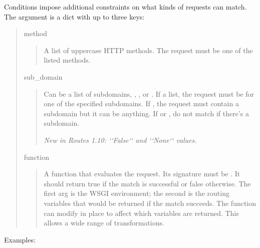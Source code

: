 \documentclass[letterpaper,10pt,english]{manual}
\begin{document}
Conditions impose additional constraints on what kinds of requests can match.
The  argument is a dict with up to three keys:
\begin{quote}

method
\begin{quote}

A list of uppercase HTTP methods.  The request must be one of the
listed methods.
\end{quote}

sub\_domain
\begin{quote}

Can be a list of subdomains, , , or .  If a
list, the request must be for one of the specified subdomains.  If
, the request must contain a subdomain but it can be anything.
If  or , do not match if there's a subdomain.

\emph{New in Routes 1.10: {}`{}`False{}`{}` and {}`{}`None{}`{}` values.}
\end{quote}

function
\begin{quote}

A function that evaluates the request.  Its signature must be
.  It should return true if the
match is successful or false otherwise.  The first arg is the WSGI
environment; the second is the routing variables that would be
returned if the match succeeds.  The function can modify 
in place to affect which variables are returned.  This allows a wide
range of transformations.
\end{quote}
\end{quote}

Examples:
\end{document}
